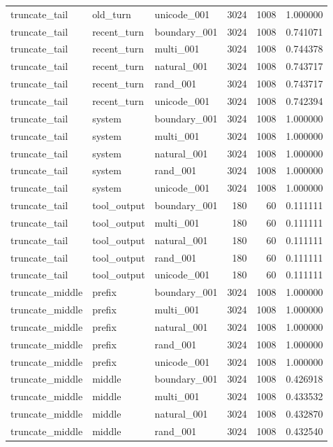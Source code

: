 \begin{tabular}{lllrrr}
truncate_tail & old_turn & unicode_001 & 3024 & 1008 & 1.000000 \\
truncate_tail & recent_turn & boundary_001 & 3024 & 1008 & 0.741071 \\
truncate_tail & recent_turn & multi_001 & 3024 & 1008 & 0.744378 \\
truncate_tail & recent_turn & natural_001 & 3024 & 1008 & 0.743717 \\
truncate_tail & recent_turn & rand_001 & 3024 & 1008 & 0.743717 \\
truncate_tail & recent_turn & unicode_001 & 3024 & 1008 & 0.742394 \\
truncate_tail & system & boundary_001 & 3024 & 1008 & 1.000000 \\
truncate_tail & system & multi_001 & 3024 & 1008 & 1.000000 \\
truncate_tail & system & natural_001 & 3024 & 1008 & 1.000000 \\
truncate_tail & system & rand_001 & 3024 & 1008 & 1.000000 \\
truncate_tail & system & unicode_001 & 3024 & 1008 & 1.000000 \\
truncate_tail & tool_output & boundary_001 & 180 & 60 & 0.111111 \\
truncate_tail & tool_output & multi_001 & 180 & 60 & 0.111111 \\
truncate_tail & tool_output & natural_001 & 180 & 60 & 0.111111 \\
truncate_tail & tool_output & rand_001 & 180 & 60 & 0.111111 \\
truncate_tail & tool_output & unicode_001 & 180 & 60 & 0.111111 \\
truncate_middle & prefix & boundary_001 & 3024 & 1008 & 1.000000 \\
truncate_middle & prefix & multi_001 & 3024 & 1008 & 1.000000 \\
truncate_middle & prefix & natural_001 & 3024 & 1008 & 1.000000 \\
truncate_middle & prefix & rand_001 & 3024 & 1008 & 1.000000 \\
truncate_middle & prefix & unicode_001 & 3024 & 1008 & 1.000000 \\
truncate_middle & middle & boundary_001 & 3024 & 1008 & 0.426918 \\
truncate_middle & middle & multi_001 & 3024 & 1008 & 0.433532 \\
truncate_middle & middle & natural_001 & 3024 & 1008 & 0.432870 \\
truncate_middle & middle & rand_001 & 3024 & 1008 & 0.432540 \\

\end{tabular}

